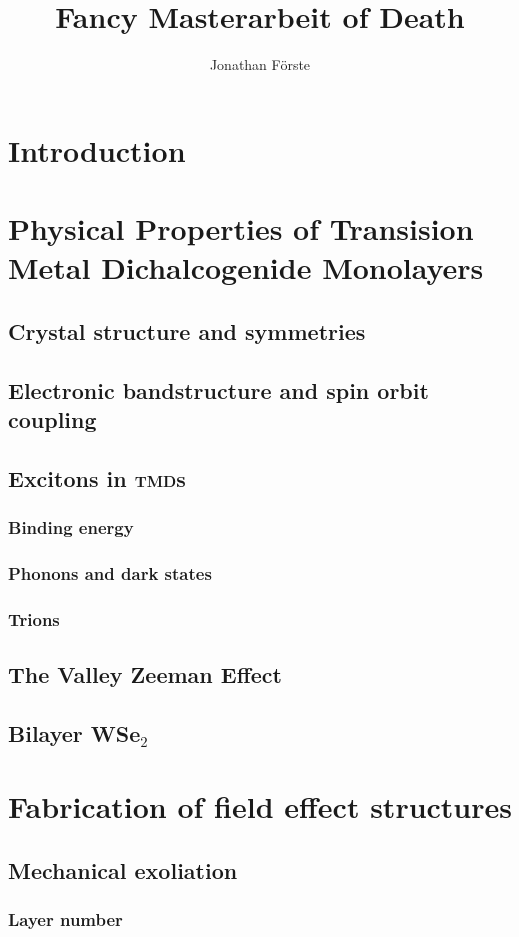 \documentclass{scrbook}
\title{Fancy Masterarbeit of Death}
\author{Jonathan Förste}
\begin{document}
\maketitle
\tableofcontents
\chapter{Introduction}
\chapter{Physical Properties of Transision Metal Dichalcogenide Monolayers}
	\section{Crystal structure and symmetries}
	\section{Electronic bandstructure and spin orbit coupling}
	\section{Excitons in \textsc{tmd}s}
		\subsection{Binding energy}
		\subsection{Phonons and dark states}
		\subsection{Trions}
	\section{The Valley Zeeman Effect}
	\section{Bilayer WSe$_2$}
\chapter{Fabrication of field effect structures}
	\section{Mechanical exoliation}
		\subsection{Layer number}
\end{document}
